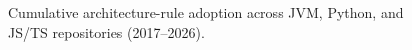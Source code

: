 \begin{figure}[t]
\centering
{}
\caption{Cumulative architecture-rule adoption across JVM, Python, and JS/TS repositories (2017--2026).}
\label{fig:adoption_timeline}
\end{figure}
